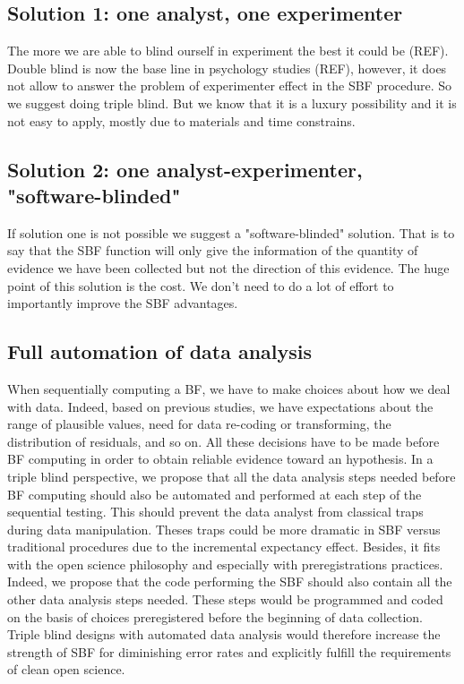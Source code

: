 \documentclass[a4paper,man,natbib,floatsintext,donotrepeattitle]{apa6}
\begin{document}
\subsection{Solution 1: one analyst, one experimenter}
The more we are able to blind ourself in experiment the best it could be (REF). Double blind is now the base line in psychology studies (REF), however, it does not allow to answer the problem of experimenter effect in the SBF procedure. So we suggest doing triple blind. But we know that it is a luxury possibility and it is not easy to apply, mostly due to materials and time constrains.   

\subsection{Solution 2: one analyst-experimenter, "software-blinded"}
If solution one is not possible we suggest a "software-blinded" solution. That is to say that the SBF function will only give the information of the quantity of evidence we have been collected but not the direction of this evidence.  
The huge point of this solution is the cost. We don't need to do a lot of effort to importantly improve the SBF advantages. 

\subsection{Full automation of data analysis}
When sequentially computing a BF, we have to make choices about how we deal with data. Indeed, based on previous studies, we have expectations about the range of plausible values, need for data re-coding or transforming, the distribution of residuals, and so on. All these decisions have to be made before BF computing in order to obtain reliable evidence toward an hypothesis. In a triple blind perspective, we propose that all the data analysis steps needed before BF computing should also be automated and performed at each step of the sequential testing. This should prevent the data analyst from classical traps during data manipulation. Theses traps could be more dramatic in SBF versus traditional procedures due to the incremental expectancy effect. Besides, it fits with the open science philosophy and especially with preregistrations practices. Indeed, we propose that the code performing the SBF should also contain all the other data analysis steps needed. These steps would be programmed and coded on the basis of choices preregistered before the beginning of data collection. Triple blind designs with automated data analysis would therefore increase the strength of SBF for diminishing error rates and explicitly fulfill the requirements of clean open science. \par
\end{document}
